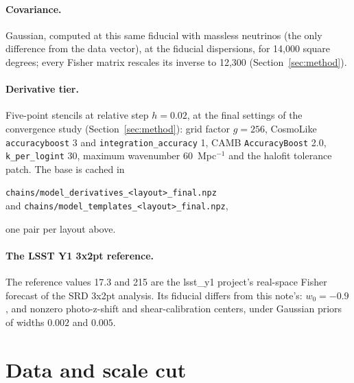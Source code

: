 \documentclass[11pt]{article}
\newcommand{\LSSTw}{17.3}
\newcommand{\LSSTo}{215}
\newcommand{\AreaCov}{14{,}000}
\newcommand{\AreaSurvey}{12{,}300}
\newcommand{\StepH}{0.02}
\newcommand{\GridFinal}{256}
\newcommand{\FinAccBoost}{3}
\newcommand{\FinIntAcc}{1}
\newcommand{\FinCambBoost}{2.0}
\newcommand{\FinKlog}{30}
\newcommand{\FinKmax}{60}
\begin{document}
\paragraph{Covariance.}
Gaussian, computed at this same fiducial with massless neutrinos (the
only difference from the data vector), at the fiducial dispersions,
for \AreaCov{} square degrees; every Fisher matrix rescales its
inverse to \AreaSurvey{} (Section~\ref{sec:method}).

\paragraph{Derivative tier.}
Five-point stencils at relative step $h = \StepH$, at the final
settings of the convergence study (Section~\ref{sec:method}): grid
factor $g = \GridFinal$, CosmoLike \texttt{accuracyboost}
\FinAccBoost{} and \texttt{integration\_accuracy} \FinIntAcc{}, CAMB
\texttt{AccuracyBoost} \FinCambBoost{}, \texttt{k\_per\_logint}
\FinKlog{}, maximum wavenumber \FinKmax{}~Mpc$^{-1}$ and the halofit
tolerance patch.  The base is cached in
\begin{center}
  \texttt{chains/model\_derivatives\_<layout>\_final.npz}
  \\ and \texttt{chains/model\_templates\_<layout>\_final.npz},
\end{center}
one pair per layout above.

\paragraph{The LSST Y1 3x2pt reference.}
The reference values \LSSTw{} and \LSSTo{} are the lsst\_y1 project's
real-space Fisher forecast of the SRD 3x2pt analysis.  Its fiducial
differs from this note's: $w_0 = -0.9$, and nonzero photo-z-shift and
shear-calibration centers, under Gaussian priors of widths $0.002$ and
$0.005$.

\section{Data and scale cut}
\label{sec:data}
\end{document}
